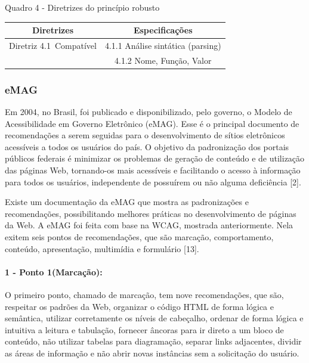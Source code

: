 \documentclass[a4paper]{article}
\begin{document}
\begin{titlepage}
Quadro 4 - Diretrizes do princípio robusto\\[-1cm]
\begin{center}
	\fontsize{8pt}{8pt}\selectfont
	\begin{longtable}{|c|c|}
		\hline
		Diretrizes & Especificações \\
		\hline
		Diretriz 4.1 Compatível& 4.1.1 Análise sintática (parsing)\\
		& 4.1.2 Nome, Função, Valor\\
		\hline
	\end{longtable}
\end{center}

\subsubsection{eMAG}

Em 2004, no Brasil, foi publicado e disponibilizado, pelo governo, o Modelo de Acessibilidade em Governo Eletrônico (eMAG). Esse é o principal documento de recomendações a serem seguidas para o desenvolvimento de sítios eletrônicos acessíveis a todos os usuários do país. O objetivo da padronização dos portais públicos federais é minimizar os problemas de geração de conteúdo e de utilização das páginas Web, tornando-os mais acessíveis e facilitando o acesso à informação para todos os usuários, independente de possuírem ou não alguma deficiência [2].

Existe um documentação da eMAG que mostra as padronizações e recomendações, possibilitando melhores práticas no desenvolvimento de páginas da Web. A eMAG foi feita com base na WCAG, mostrada anteriormente. Nela exitem seis pontos de recomendações, que são marcação, comportamento, conteúdo, apresentação, multimídia e formulário [13].

\paragraph{1 - Ponto 1(Marcação): }

O primeiro ponto, chamado de marcação, tem nove recomendações, que são, respeitar os padrões da Web, organizar o código HTML de forma lógica e semântica, utilizar corretamente os níveis de cabeçalho, ordenar de forma lógica e intuitiva a leitura e tabulação, fornecer âncoras para ir direto a um bloco de conteúdo, não utilizar tabelas para diagramação, separar links adjacentes, dividir as áreas de informação e não abrir novas instâncias sem a solicitação do usuário.


\end{titlepage}
\end{document}
